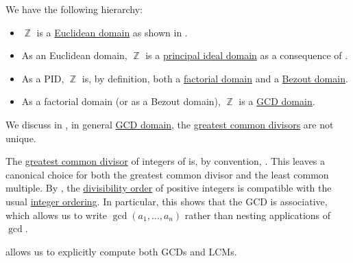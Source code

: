 \begin{remark}\label{rem:integer_domain_chain}
  We have the following hierarchy:
  \begin{itemize}
    \item \( \BbbZ \) is a \hyperref[def:euclidean_domain]{Euclidean domain} as shown in .
    \item As an Euclidean domain, \( \BbbZ \) is a \hyperref[def:principal_ideal_domain]{principal ideal domain} as a consequence of .
    \item As a PID, \( \BbbZ \) is, by definition, both a \hyperref[def:factorial_domain]{factorial domain} and a \hyperref[def:bezout_domain]{Bezout domain}.
    \item As a factorial domain (or as a Bezout domain), \( \BbbZ \) is a \hyperref[def:gcd_domain]{GCD domain}.
  \end{itemize}
\end{remark}

\begin{remark}\label{rem:integer_gcd}
  We discuss in , in general \hyperref[def:gcd_domain]{GCD domain}, the \hyperref[def:gcd]{greatest common divisors} are not unique.

  The \hyperref[def:gcd]{greatest common divisor} of integers of is, by convention, . This leaves a canonical choice for both the greatest common divisor and the least common multiple. By , the \hyperref[thm:semiring_divisibility_order]{divisibility order} of positive integers is compatible with the usual \hyperref[def:integer_ordering]{integer ordering}. In particular, this shows that the GCD is associative, which allows us to write \( \gcd(a_1, \ldots, a_n) \) rather than nesting applications of \( \gcd \).

   allows us to explicitly compute both GCDs and LCMs.
\end{remark}
